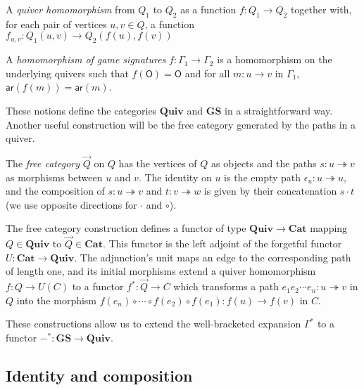\documentclass[format=sigplan,authordraft]{acmart}
\newcommand{\kw}[1]{\ensuremath{ \mathsf{#1} }}
\begin{document}
\begin{definition}
A \emph{quiver homomorphism} from $Q_1$ to $Q_2$
as a function $f : Q_1 \rightarrow Q_2$ together with,
for each pair of vertices $u, v \in Q$,
a function $f_{u,v} : Q_1(u, v) \rightarrow Q_2(f(u), f(v))$
\end{definition}

\begin{definition}
A \emph{homomorphism of game signatures} $f : \Gamma_1 \rightarrow \Gamma_2$
is a homomorphism on the underlying quivers
such that $f(\kw{O}) = \kw{O}$ and for all
$m : u \rightarrow v$ in $\Gamma_1$,
$\kw{ar}(f(m)) = \kw{ar}(m)$.
\end{definition}

These notions define the categories
$\mathbf{Quiv}$ and $\mathbf{GS}$
in a straightforward way.
Another useful construction will be the
free category generated by the paths in a quiver.

\begin{definition}
The \emph{free category} $\vec{Q}$ on $Q$
has the vertices of $Q$ as objects and
the paths $s : u \twoheadrightarrow v$
as morphisms between $u$ and $v$.
The identity on $u$ is the empty path
$\epsilon_u : u \twoheadrightarrow u$,
and the composition of $s : u \twoheadrightarrow v$ and
$t : v \twoheadrightarrow w$
is given by their concatenation $s \cdot t$
(we use opposite directions for $\cdot$ and $\circ$).
\end{definition}

The free category construction defines a functor
of type $\mathbf{Quiv} \rightarrow \mathbf{Cat}$
mapping $Q \in \mathbf{Quiv}$ to $\vec{Q} \in \mathbf{Cat}$.
This functor is the left adjoint of
the forgetful functor $U : \mathbf{Cat} \rightarrow \mathbf{Quiv}$.
The adjunction's unit maps an edge to
the corresponding path of length one,
and its initial morphisms extend a quiver homomorphism
$f : Q \rightarrow U(C)$
to a functor $f^* : \vec{Q} \rightarrow C$
which transforms a path
$e_1 e_2 \cdots e_n : u \twoheadrightarrow v$ in $Q$
into the morphism
$f(e_n) \circ \cdots \circ f(e_2) \circ f(e_1) : f(u) \rightarrow f(v)$ in $C$.

These constructions allow us to extend
the well-bracketed expansion $\Gamma^*$ to a functor
$-^* : \mathbf{GS} \rightarrow \mathbf{Quiv}$.



\subsection{Identity and composition} %
\end{document}
